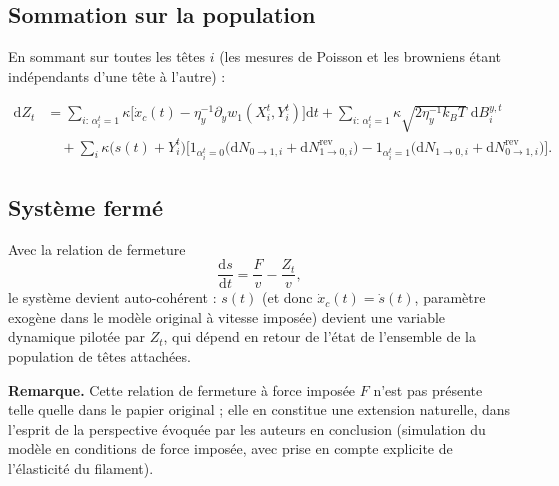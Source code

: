 \documentclass[11pt,a4paper]{article}
\newcommand{\dd}{\mathrm{d}}
\newcommand{\indic}[1]{\mathrm{1}_{#1}}
\begin{document}
\subsection{Sommation sur la population}

En sommant sur toutes les têtes $i$ (les mesures de Poisson et les
browniens étant indépendants d'une tête à l'autre) :

\begin{align*}
\dd Z_t
&= \sum_{i:\,\alpha_i^t=1} \kappa\Big[\dot x_c(t)
- \eta_y^{-1}\partial_y w_1(X_i^t,Y_i^t)\Big]\dd t
+ \sum_{i:\,\alpha_i^t=1} \kappa\sqrt{2\eta_y^{-1}k_BT}\;\dd B_i^{y,t} \\[1mm]
&\quad + \sum_i \kappa\big(s(t)+Y_i^t\big)\Big[
\indic{\alpha_i^t=0}\big(\dd N_{0\to1,i} + \dd N^{\mathrm{rev}}_{1\to0,i}\big)
- \indic{\alpha_i^t=1}\big(\dd N_{1\to0,i} + \dd N^{\mathrm{rev}}_{0\to1,i}\big)
\Big].
\end{align*}

\subsection{Système fermé}

Avec la relation de fermeture
\[
\frac{\dd s}{\dd t} = \frac{F}{v} - \frac{Z_t}{v},
\]
le système devient auto-cohérent : $s(t)$ (et donc $\dot x_c(t) = \dot s(t)$,
paramètre exogène dans le modèle original à vitesse imposée) devient
une variable dynamique pilotée par $Z_t$, qui dépend en retour de
l'état de l'ensemble de la population de têtes attachées.

\bigskip
\noindent
\textbf{Remarque.} Cette relation de fermeture à force imposée $F$
n'est pas présente telle quelle dans le papier original ; elle en
constitue une extension naturelle, dans l'esprit de la perspective
évoquée par les auteurs en conclusion (simulation du modèle en
conditions de force imposée, avec prise en compte explicite de
l'élasticité du filament).
\end{document}
